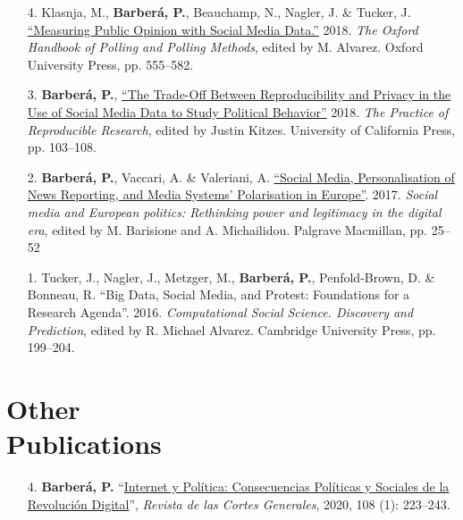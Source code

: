 \documentclass[margin,line,11pt]{resume}
\begin{document}
\begin{resume}
\begin{itemize}[leftmargin=5.5mm]
\newpage   

\item[4.] Klasnja, M., \textbf{Barber\'{a}, P.}, Beauchamp, N., Nagler, J. \& Tucker, J. \href{http://www.oxfordhandbooks.com/view/10.1093/oxfordhb/9780190213299.001.0001/oxfordhb-9780190213299-e-3}{``Measuring Public Opinion with Social Media Data.''} 2018. \textit{The Oxford Handbook of Polling and Polling Methods}, edited by M. Alvarez. Oxford University Press, pp. 555--582.

\item[3.] \textbf{Barber\'{a}, P.}, \href{https://www.practicereproducibleresearch.org/case-studies/barbera.html}{``The Trade-Off Between Reproducibility and Privacy in the Use of Social Media Data to Study Political Behavior''} 2018. \textit{The Practice of Reproducible Research}, edited by Justin Kitzes. University of California Press, pp. 103--108. 


\item[2.] \textbf{Barber\'{a}, P.}, Vaccari, A. \& Valeriani, A. \href{https://link.springer.com/chapter/10.1057/978-1-137-59890-5_2}{``Social Media, Personalisation of News Reporting, and Media Systems' Polarisation in Europe''}. 2017. \textit{Social media and European politics: Rethinking power and legitimacy in the digital era}, edited by M. Barisione and A. Michailidou. Palgrave Macmillan, pp. 25--52

\item[1.] Tucker, J., Nagler, J., Metzger, M., \textbf{Barber\'{a}, P.}, Penfold-Brown, D. \& Bonneau, R. ``Big Data, Social Media, and Protest: Foundations for a Research Agenda''. 2016. \textit{Computational Social Science. Discovery and Prediction}, edited by R. Michael Alvarez. Cambridge University Press, pp. 199--204.
\end{itemize}


\section{\mysidestyle Other\\Publications}
    \vspace{.15cm}    
\begin{itemize}[leftmargin=5.5mm]
\item[4.] \textbf{Barber\'{a}, P.} ``\href{https://revista.cortesgenerales.es/rcg/article/view/1486}{Internet y Pol\'{i}tica: Consecuencias Pol\'{i}ticas y Sociales de la Revoluci\'{o}n Digital}'', \textit{Revista de las Cortes Generales}, 2020, 108 (1): 223--243.


\end{itemize}
\end{resume}
\end{document}
